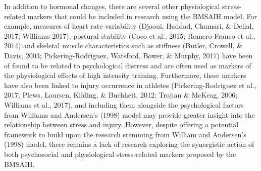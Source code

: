 \documentclass[man,floatsintext]{apa6}
\begin{document}
In addition to hormonal changes, there are several other physiological stress-related markers that could be included in research using the BMSAIH model.
For example, measures of heart rate variability (Djaoui, Haddad, Chamari, \& Dellal, 2017; Williams 2017),
postural stability (Coco et al., 2015; Romero-Franco et al., 2014) and skeletal muscle characteristics such as stiffness (Butler, Crowell, \& Davis, 2003; Pickering-Rodriguez, Watsford, Bower, \& Murphy, 2017) have been of found to be related to psychological distress and are often used as markers of the physiological effects of high intensity training.
Furthermore, these markers have also been linked to injury occurrence in athletes (Pickering-Rodriguez et al., 2017; Plews, Laursen, Kilding, \& Buchheit, 2012; Trojian \& McKeag, 2006; Williams et al., 2017), and including them alongside the psychological factors from Williams and Andersen's (1998) model may provide greater insight into the relationship between stress and injury.
However, despite offering a potential framework to build upon the research stemming from William and Andersen's (1998) model, there remains a lack of research exploring the synergistic action of both psychosocial and physiological stress-related markers proposed by the BMSAIH.
\end{document}
